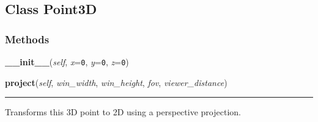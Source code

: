 

\subsection{Class Point3D}

    \label{polygon:Point3D}


  \subsubsection{Methods}

    \label{polygon:Point3D:__init__}

    \vspace{0.5ex}

\hspace{.8\funcindent}\begin{boxedminipage}{\funcwidth}

    \raggedright \textbf{\_\_init\_\_}(\textit{self}, \textit{x}={\tt 0}, \textit{y}={\tt 0}, \textit{z}={\tt 0})

\setlength{\parskip}{2ex}
\setlength{\parskip}{1ex}
    \end{boxedminipage}

    \label{polygon:Point3D:project}

    \vspace{0.5ex}

\hspace{.8\funcindent}\begin{boxedminipage}{\funcwidth}

    \raggedright \textbf{project}(\textit{self}, \textit{win\_width}, \textit{win\_height}, \textit{fov}, \textit{viewer\_distance})

    \vspace{-1.5ex}

    \rule{\textwidth}{0.5\fboxrule}
\setlength{\parskip}{2ex}
    Transforms this 3D point to 2D using a perspective projection.

\setlength{\parskip}{1ex}
    \end{boxedminipage}

